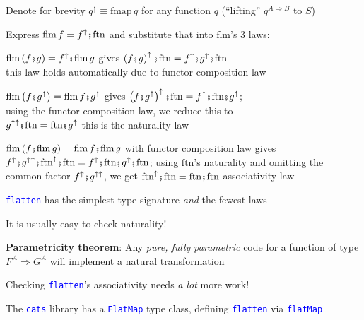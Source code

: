 Denote for brevity $q^{\uparrow}\equiv\text{fmap}\,q$ for any function
$q$ (``lifting'' $q^{A\Rightarrow B}$ to $S$)

Express $\text{flm}\,f=f^{\uparrow}\bef\text{ftn}$ and substitute
that into $\text{flm}$'s 3 laws:

{\footnotesize{}$\text{flm}\left(f\bef g\right)=f^{\uparrow}\bef\text{flm}\,g$}
gives {\footnotesize{}$\left(f\bef g\right)^{\uparrow}\bef\text{ftn}=f^{\uparrow}\bef g^{\uparrow}\bef\text{ftn}$}\\
\textendash{} this law holds automatically due to functor composition
law

{\footnotesize{}$\text{flm}\left(f\bef g^{\uparrow}\right)=\text{flm}\,f\bef g^{\uparrow}$}
gives {\footnotesize{}$\left(f\bef g^{\uparrow}\right)^{\uparrow}\bef\text{ftn}=f^{\uparrow}\bef\text{ftn}\bef g^{\uparrow}$};\\
using the functor composition law, we reduce this to\\
{\footnotesize{}$g^{\uparrow\uparrow}\bef\text{ftn}=\text{ftn}\bef g^{\uparrow}$}
\textendash{} this is the naturality law

{\footnotesize{}$\text{flm}\left(f\bef\text{flm}\,g\right)=\text{flm}\,f\bef\text{flm}\,g$
}with functor composition law gives{\footnotesize{} $f^{\uparrow}\bef g^{\uparrow\uparrow}\bef\text{ftn}^{\uparrow}\bef\text{ftn}=f^{\uparrow}\bef\text{ftn}\bef g^{\uparrow}\bef\text{ftn}$;}
using {\footnotesize{}$\text{ftn}$}'s naturality and omitting the
common factor{\footnotesize{} $f^{\uparrow}\bef g^{\uparrow\uparrow}$},
we get{\footnotesize{} $\text{ftn}^{\uparrow}\bef\text{ftn}=\text{ftn}\bef\text{ftn}$}
\textendash{} associativity law

\texttt{\textcolor{blue}{\footnotesize{}flatten}} has the simplest
type signature \emph{and} the fewest laws

It is usually easy to check naturality!

\textbf{Parametricity theorem}: Any \emph{pure, fully parametric}
code for a function of type $F^{A}\Rightarrow G^{A}$ will implement
a natural transformation

Checking \texttt{\textcolor{blue}{\footnotesize{}flatten}}'s associativity
needs \emph{a lot} more work!

The \texttt{\textcolor{blue}{\footnotesize{}cats}} library has a \texttt{\textcolor{blue}{\footnotesize{}FlatMap}}
type class, defining \texttt{\textcolor{blue}{\footnotesize{}flatten}}
via \texttt{\textcolor{blue}{\footnotesize{}flatMap}} 


